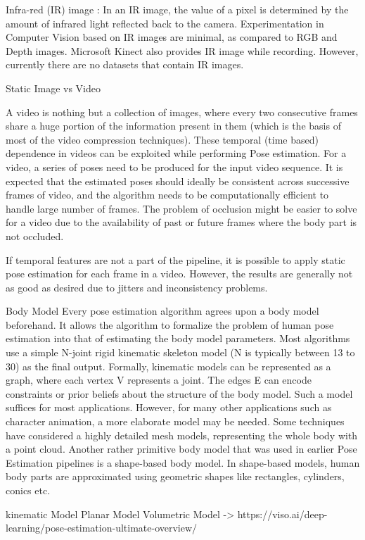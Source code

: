Infra-red (IR) image : In an IR image, the value of a pixel is determined by the amount of infrared
light reflected back to the camera. Experimentation in Computer Vision based on IR images are minimal,
as compared to RGB and Depth images. Microsoft Kinect also provides IR image while recording.
However, currently there are no datasets that contain IR images.

Static Image vs Video

A video is nothing but a collection of images, where every two consecutive frames share a huge
portion of the information present in them (which is the basis of most of the video compression
techniques). These temporal (time based) dependence in videos can be exploited while performing
Pose estimation.
For a video, a series of poses need to be produced for the input video sequence. It is expected
that the estimated poses should ideally be consistent across successive frames of video, and the
algorithm needs to be computationally efficient to handle large number of frames. The problem of
occlusion might be easier to solve for a video due to the availability of past or future frames
where the body part is not occluded.

If temporal features are not a part of the pipeline, it is possible to apply static pose estimation
for each frame in a video. However, the results are generally not as good as desired due to jitters
and inconsistency problems.

Body Model
Every pose estimation algorithm agrees upon a body model beforehand. It allows the algorithm to formalize the problem of human pose estimation into that of estimating the body model parameters. Most algorithms use a simple N-joint rigid kinematic skeleton model (N is typically between 13 to 30) as the final output. Formally, kinematic models can be represented as a graph, where each vertex V represents a joint. The edges E can encode constraints or prior beliefs about the structure of the body model.
Such a model suffices for most applications. However, for many other applications such as character animation, a more elaborate model may be needed. Some techniques have considered a highly detailed mesh models, representing the whole body with a point cloud.
Another rather primitive body model that was used in earlier Pose Estimation pipelines is a shape-based body model. In shape-based models, human body parts are approximated using geometric shapes like rectangles, cylinders, conics etc.

kinematic Model
Planar Model
Volumetric Model
-> https://viso.ai/deep-learning/pose-estimation-ultimate-overview/

